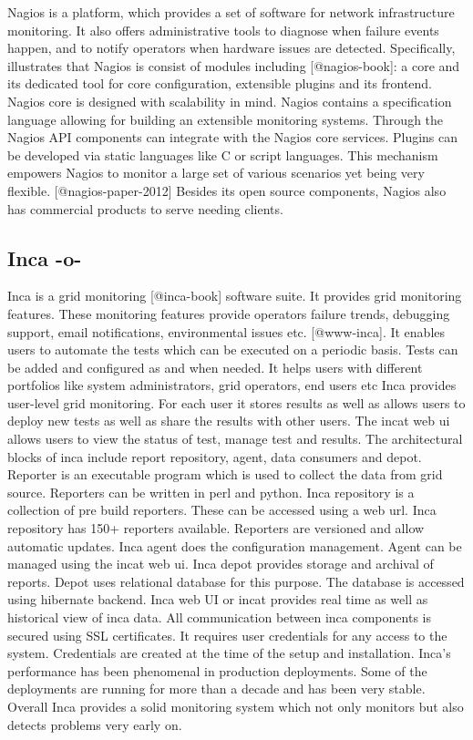 Nagios is a platform, which provides a set of software for network
infrastructure monitoring. It also offers administrative tools to
diagnose when failure events happen, and to notify operators when
hardware issues are detected. Specifically, illustrates that Nagios is
consist of modules including [@nagios-book]: a core and its
dedicated tool for core configuration, extensible plugins and its
frontend. Nagios core is designed with scalability in mind.  Nagios
contains a specification language allowing for building an extensible
monitoring systems.  Through the Nagios API components can integrate
with the Nagios core services. Plugins can be developed via static
languages like C or script languages. This mechanism empowers Nagios
to monitor a large set of various scenarios yet being very
flexible. [@nagios-paper-2012] Besides its open source components,
Nagios also has commercial products to serve needing clients.


\subsection{Inca -o-}

Inca is a grid monitoring [@inca-book] software suite. It provides
grid monitoring features. These monitoring features provide operators
failure trends, debugging support, email notifications, environmental
issues etc. [@www-inca]. It enables users to automate the tests
which can be executed on a periodic basis. Tests can be added and
configured as and when needed. It helps users with different
portfolios like system administrators, grid operators, end users etc
Inca provides user-level grid monitoring. For each user it stores
results as well as allows users to deploy new tests as well as share
the results with other users. The incat web ui allows users to view
the status of test, manage test and results. The architectural blocks
of inca include report repository, agent, data consumers and
depot. Reporter is an executable program which is used to collect the
data from grid source. Reporters can be written in perl and
python. Inca repository is a collection of pre build reporters.  These
can be accessed using a web url. Inca repository has 150+ reporters
available. Reporters are versioned and allow automatic updates. Inca
agent does the configuration management. Agent can be managed using
the incat web ui. Inca depot provides storage and archival of
reports. Depot uses relational database for this purpose. The database
is accessed using hibernate backend.  Inca web UI or incat provides
real time as well as historical view of inca data.  All communication
between inca components is secured using SSL certificates. It requires
user credentials for any access to the system. Credentials are created
at the time of the setup and installation. Inca's performance has been
phenomenal in production deployments. Some of the deployments are
running for more than a decade and has been very stable. Overall Inca
provides a solid monitoring system which not only monitors but also
detects problems very early on.

